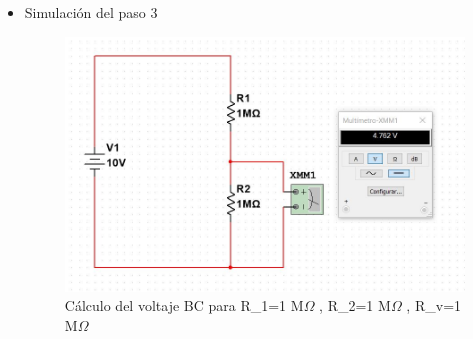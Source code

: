 \documentclass[twoside,twocolumn]{article}
\begin{document}
\begin{itemize}
\item Simulación del paso 3
    \begin{figure}[h]
    \centering
    \includegraphics[scale=0.28]{imagenes1/3.JPG}
    \caption{Cálculo del voltaje BC para R_{1}=1 M$\Omega$ , R_{2}=1 M$\Omega$ , R_{v}=1 M$\Omega$ }
    \label{fig:circuito4}
    \end{figure}


\end{itemize}
\end{document}
